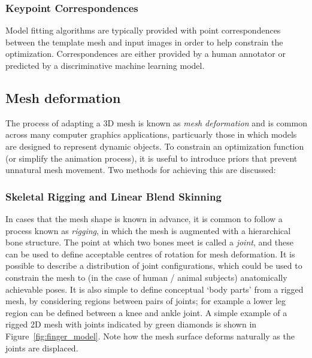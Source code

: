     \subsubsection{Keypoint Correspondences}
    Model fitting algorithms are typically provided with point correspondences between the template mesh and input images in order to help constrain the optimization. Correspondences are either provided by a human annotator or predicted by a discriminative machine learning model.
    
    \subsection{Mesh deformation}
    The process of adapting a 3D mesh is known as \textit{mesh deformation} and is common across many computer graphics applications, particuarly those in which models are designed to represent dynamic objects. To constrain an optimization function (or simplify the animation process), it is useful to introduce priors that prevent unnatural mesh movement. Two methods for achieving this are discussed:

        \subsubsection{Skeletal Rigging and Linear Blend Skinning}
        In cases that the mesh shape is known in advance, it is common to follow a process known as \textit{rigging}, in which the mesh is augmented with a hierarchical bone structure. The point at which two bones meet is called a \emph{joint}, and these can be used to define acceptable centres of rotation for mesh deformation. It is possible to describe a distribution of joint configurations, which could be used to constrain the mesh to (in the case of human / animal subjects) anatomically achievable poses. It is also simple to define conceptual `body parts' from a rigged mesh, by considering regions between pairs of joints; for example a lower leg region can be defined between a knee and ankle joint. A simple example of a rigged 2D mesh with joints indicated by green diamonds is shown in Figure~\ref{fig:finger_model}. Note how the mesh surface deforms naturally as the joints are displaced.
        
